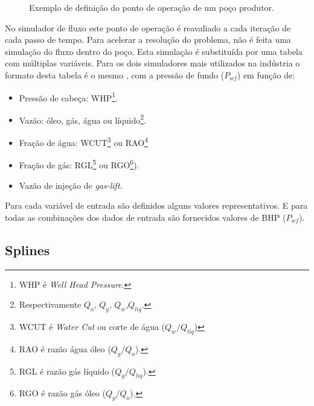 \documentclass[final,5p]{elsarticle}
\numberwithin{equation}{section}
\begin{document}
\begin{figure}[hbt!]
            \caption{Exemplo de definição do ponto de operação de um poço produtor.}
            \label{fig:ipr}
        \end{figure}

        No simulador de fluxo este ponto de operação é reavaliado a cada iteração de cada passo de tempo. Para acelerar a resolução do problema, não é feita uma simulação do fluxo dentro do poço. Esta simulação é substituída por uma tabela com múltiplas variáveis. Para os dois simuladores mais utilizados na indústria o formato desta tabela é o mesmo \cite{computer2022cmg}\cite{schlumberger2009technical}, com a pressão de fundo ($P_{wf}$) em função de:

        \begin{itemize}
            \item Pressão de cabeça: WHP\footnote{WHP é \emph{Well Head Pressure}.}.
            \item Vazão: óleo, gás, água ou líquido\footnote{Respectivamente $Q_o$, $Q_g$, $Q_w$,$Q_{liq}$.}.
            \item Fração de água: WCUT\footnote{WCUT é \emph{Water Cut} ou corte de água ($Q_w/Q_{liq}$)} ou RAO\footnote{RAO é razão água óleo ($Q_g/Q_o$).}
            \item Fração de gás: RGL\footnote{RGL é razão gás líquido ($Q_g/Q_{liq}$).} ou RGO\footnote{RGO é razão gás óleo ($Q_g/Q_o$).}).
            \item Vazão de injeção de \emph{gas-lift}.
        \end{itemize}

        Para cada variável de entrada são definidos alguns valores representativos. E para todas as combinações dos dados de entrada são fornecidos valores de BHP ($P_{wf}$).    

    \subsection{Splines}
    
\end{document}
